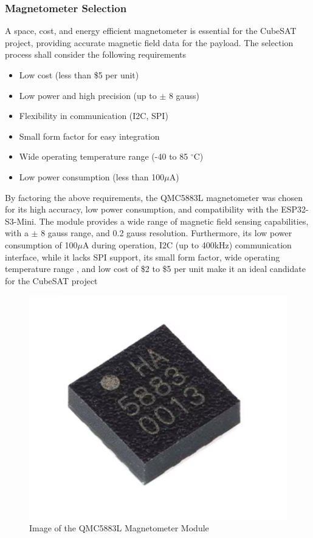 \documentclass{report}
\begin{document}
                \subsubsection{Magnetometer Selection}
                    A space, cost, and energy efficient magnetometer is essential for the CubeSAT project,
                    providing accurate magnetic field data for the payload. The selection process shall consider
                    the following requirements
                    \begin{itemize}
                        \item Low cost (less than \$5 per unit)
                        \item Low power and high precision (up to $\pm$ 8 gauss)
                        \item Flexibility in communication (I2C, SPI)
                        \item Small form factor for easy integration
                        \item Wide operating temperature range (-40 to 85 $^\circ$C)
                        \item Low power consumption (less than 100$\mu$A)
                    \end{itemize}
                    By factoring the above requirements, the QMC5883L magnetometer was chosen for its high accuracy,
                    low power consumption, and compatibility with the ESP32-S3-Mini. The module provides a wide range of magnetic field sensing capabilities,
                    with a $\pm$ 8 gauss range, and 0.2 gauss resolution. Furthermore, its low power consumption of 100$\mu$A during operation, I2C (up to 400kHz) communication interface,
                    while it lacks SPI support, its small form factor, wide operating temperature range \cite{qmc5883}, and low cost of \$2 to \$5 per unit make it an ideal candidate for the CubeSAT project \cite{qmc5883}
                    \begin{figure}[H]
                        \centering
                        \includegraphics[width=0.2\linewidth]{figures/MAG_IMG.png}
                        \caption{Image of the QMC5883L Magnetometer Module}
                        \label{fig:mag_img}
                    \end{figure}
\end{document}

